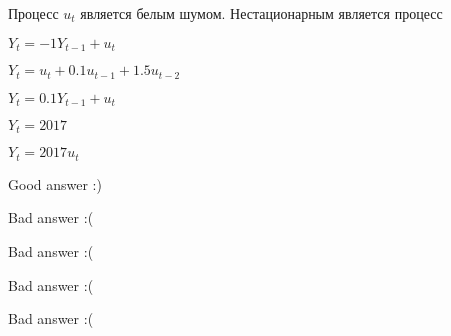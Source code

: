
\begin{question}
Процесс \(u_t\) является белым шумом. Нестационарным является процесс
\begin{answerlist}
  \item \(Y_t = -1Y_{t-1} + u_t\)
  \item \(Y_t = u_t + 0.1u_{t-1} + 1.5u_{t-2}\)
  \item \(Y_t = 0.1Y_{t-1} + u_t\)
  \item \(Y_t = 2017\)
  \item \(Y_t = 2017u_t\)
\end{answerlist}
\end{question}

\begin{solution}
\begin{answerlist}
  \item Good answer :)
  \item Bad answer :(
  \item Bad answer :(
  \item Bad answer :(
  \item Bad answer :(
\end{answerlist}
\end{solution}

